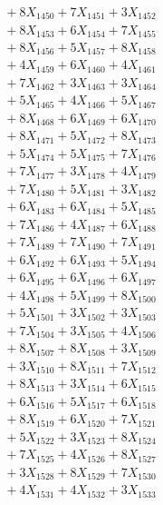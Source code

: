 \documentclass[a4paper,10pt]{article}
\begin{document}
{\begin{align}
&\;  + 8 X_{1450} + 7 X_{1451} + 3 X_{1452} \\[0.3ex]
&\;  + 8 X_{1453} + 6 X_{1454} + 7 X_{1455} \\[0.3ex]
&\;  + 8 X_{1456} + 5 X_{1457} + 8 X_{1458} \\[0.3ex]
&\;  + 4 X_{1459} + 6 X_{1460} + 4 X_{1461} \\[0.3ex]
&\;  + 7 X_{1462} + 3 X_{1463} + 3 X_{1464} \\[0.3ex]
&\;  + 5 X_{1465} + 4 X_{1466} + 5 X_{1467} \\[0.3ex]
&\;  + 8 X_{1468} + 6 X_{1469} + 6 X_{1470} \\[0.3ex]
&\;  + 8 X_{1471} + 5 X_{1472} + 8 X_{1473} \\[0.3ex]
&\;  + 5 X_{1474} + 5 X_{1475} + 7 X_{1476} \\[0.3ex]
&\;  + 7 X_{1477} + 3 X_{1478} + 4 X_{1479} \\[0.5ex]\allowbreak
&\;  + 7 X_{1480} + 5 X_{1481} + 3 X_{1482} \\[0.3ex]
&\;  + 6 X_{1483} + 6 X_{1484} + 5 X_{1485} \\[0.3ex]
&\;  + 7 X_{1486} + 4 X_{1487} + 6 X_{1488} \\[0.3ex]
&\;  + 7 X_{1489} + 7 X_{1490} + 7 X_{1491} \\[0.3ex]
&\;  + 6 X_{1492} + 6 X_{1493} + 5 X_{1494} \\[0.3ex]
&\;  + 6 X_{1495} + 6 X_{1496} + 6 X_{1497} \\[0.3ex]
&\;  + 4 X_{1498} + 5 X_{1499} + 8 X_{1500} \\[0.3ex]
&\;  + 5 X_{1501} + 3 X_{1502} + 3 X_{1503} \\[0.3ex]
&\;  + 7 X_{1504} + 3 X_{1505} + 4 X_{1506} \\[0.3ex]
&\;  + 8 X_{1507} + 8 X_{1508} + 3 X_{1509} \\[0.5ex]\allowbreak
&\;  + 3 X_{1510} + 8 X_{1511} + 7 X_{1512} \\[0.3ex]
&\;  + 8 X_{1513} + 3 X_{1514} + 6 X_{1515} \\[0.3ex]
&\;  + 6 X_{1516} + 5 X_{1517} + 6 X_{1518} \\[0.3ex]
&\;  + 8 X_{1519} + 6 X_{1520} + 7 X_{1521} \\[0.3ex]
&\;  + 5 X_{1522} + 3 X_{1523} + 8 X_{1524} \\[0.3ex]
&\;  + 7 X_{1525} + 4 X_{1526} + 8 X_{1527} \\[0.3ex]
&\;  + 3 X_{1528} + 8 X_{1529} + 7 X_{1530} \\[0.3ex]
&\;  + 4 X_{1531} + 4 X_{1532} + 3 X_{1533} \\[0.3ex]

\end{align}}
\end{document}
